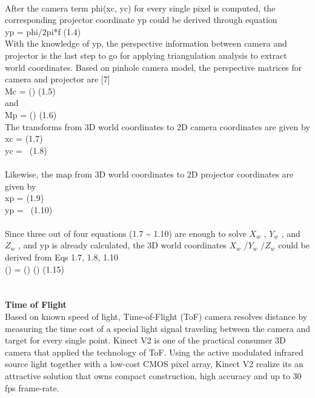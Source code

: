 \\After the camera term phi(xc, yc) for every single pixel is computed, the corresponding projector coordinate yp could be derived through equation\\
yp = phi/2pi*f		(1.4)%
\\With the knowledge of yp, the perspective information between camera and projector is the last step to go for applying triangulation analysis to extract world coordinates. Based on pinhole camera model, the perspective matrices for camera and projector are [7]\\
Mc = () 		(1.5) %
\\and \\
Mp = ()		(1.6)%
\\The transforms from 3D world coordinates to 2D camera coordinates are given by\\
xc = \textendash		(1.7)\\%
yc = \textendash\ 	(1.8)\\%
\\Likewise, the map from 3D world coordinates to 2D projector coordinates are given by\\
xp = \textendash		(1.9)\\%
yp = \textendash\ 	(1.10)\\%
\\
Since three out of four equations (1.7 \~{} 1.10) are enough to solve \(X_{w}\) , \(Y_{w}\) , and \(Z_{w}\) , and yp is already calculated, the 3D world coordinates \(X_{w}\) /\(Y_{w}\) /\(Z_{w}\)  could be derived from Eqs 1.7, 1.8, 1.10\\
() = () ()			(1.15)%
\\
\\
\\\textbf {Time of Flight}\\
 Based on known speed of light, Time-of-Flight (ToF) camera resolves distance by measuring the time cost of a special light signal traveling between the camera and target for every single point. Kinect V2 is one of the practical consumer 3D camera that applied the technology of ToF. Using the active modulated infrared source light together with a low-cost CMOS pixel array, Kinect V2 realize its an attractive solution that owns compact construction, high accuracy and up to 30 fps frame-rate. \\
